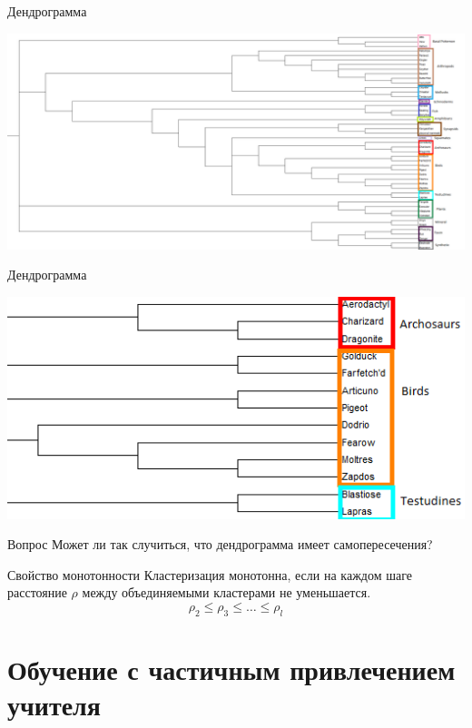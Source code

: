 \documentclass[10pt]{beamer}
\begin{document}
\begin{frame}{Дендрограмма}
  \begin{center}
    \includegraphics[height=\textheight, width=\textwidth, keepaspectratio = true]{images/dendrogram}    
  \end{center}
\end{frame}

\begin{frame}{Дендрограмма}
  \begin{center}
    \includegraphics[height=0.8 \textheight, width=0.8 \textwidth, keepaspectratio = true]{images/dendrogram1}    
  \end{center}
\end{frame}

\begin{frame}{Вопрос}
  \centering  
  Может ли так случиться, что дендрограмма имеет самопересечения?
\end{frame}

\begin{frame}{Свойство монотонности}
  Кластеризация монотонна, если на каждом шаге расстояние $\rho$ между объединяемыми кластерами не уменьшается.\\
  \bigbreak  
  $$\rho_2 \leq \rho_3 \leq \dots \leq \rho_l$$
\end{frame}

\section{Обучение с частичным привлечением учителя}
\end{document}
